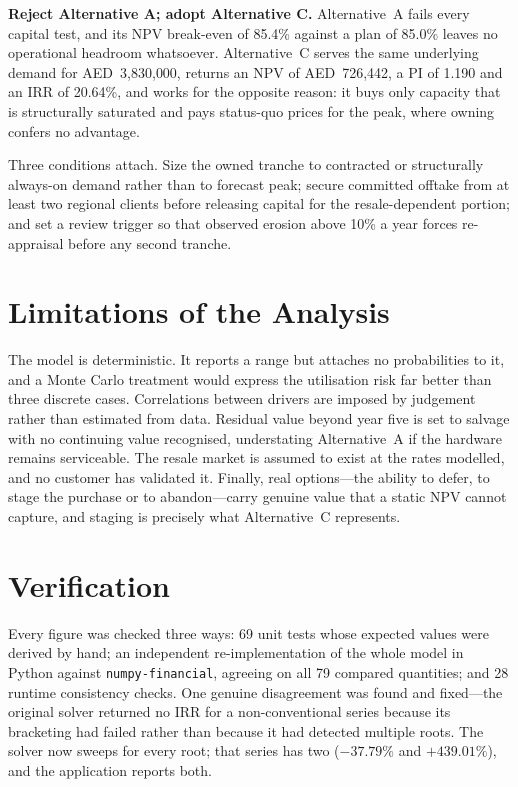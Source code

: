 \documentclass[11pt,a4paper]{article}
\newcommand{\aed}[1]{AED~#1}
\begin{document}
\textbf{Reject Alternative A; adopt Alternative C.} Alternative~A fails every
capital test, and its NPV break-even of 85.4\% against a plan of 85.0\% leaves no
operational headroom whatsoever. Alternative~C serves the same underlying demand
for \aed{3{,}830{,}000}, returns an NPV of \aed{726{,}442}, a PI of 1.190 and an
IRR of 20.64\%, and works for the opposite reason: it buys only capacity that is
structurally saturated and pays status-quo prices for the peak, where owning
confers no advantage.

Three conditions attach. Size the owned tranche to contracted or structurally
always-on demand rather than to forecast peak; secure committed offtake from at
least two regional clients before releasing capital for the resale-dependent
portion; and set a review trigger so that observed erosion above 10\% a year
forces re-appraisal before any second tranche.

\section{Limitations of the Analysis}

The model is deterministic. It reports a range but attaches no probabilities to
it, and a Monte Carlo treatment would express the utilisation risk far better
than three discrete cases. Correlations between drivers are imposed by
judgement rather than estimated from data. Residual value beyond
year five is set to salvage with no continuing value recognised, understating
Alternative~A if the hardware remains serviceable. The resale market is assumed
to exist at the rates modelled, and no customer has validated it. Finally, real options---the ability to defer, to stage the purchase
or to abandon---carry genuine value that a static NPV cannot capture, and staging
is precisely what Alternative~C represents.

\section*{Verification}

Every figure was checked three ways: 69 unit tests whose expected values were
derived by hand; an independent re-implementation of the whole model in Python
against \texttt{numpy-financial}, agreeing on all 79 compared quantities; and 28
runtime consistency checks. One genuine disagreement was found and fixed---the
original solver returned no IRR for a non-conventional series because its
bracketing had failed rather than because it had detected multiple roots. The
solver now sweeps for every root; that series has two ($-37.79\%$ and
$+439.01\%$), and the application reports both.
\end{document}
